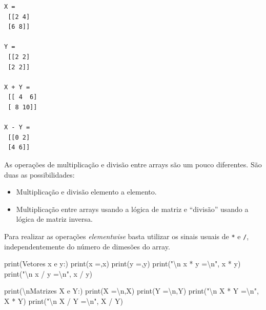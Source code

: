 \documentclass[
  brazilian,
  letterpaper,
  DIV=11,
  numbers=noendperiod]{scrreprt}
\newenvironment{Shaded}{\begin{snugshade}}{\end{snugshade}}
\newcommand{\BuiltInTok}[1]{\textcolor[rgb]{0.00,0.23,0.31}{#1}}
\newcommand{\CharTok}[1]{\textcolor[rgb]{0.13,0.47,0.30}{#1}}
\newcommand{\NormalTok}[1]{\textcolor[rgb]{0.00,0.23,0.31}{#1}}
\newcommand{\OperatorTok}[1]{\textcolor[rgb]{0.37,0.37,0.37}{#1}}
\newcommand{\StringTok}[1]{\textcolor[rgb]{0.13,0.47,0.30}{#1}}
\providecommand{\tightlist}{%
  \setlength{\itemsep}{0pt}\setlength{\parskip}{0pt}}
\begin{document}
\begin{verbatim}
X =
 [[2 4]
 [6 8]]

Y =
 [[2 2]
 [2 2]]

X + Y =
 [[ 4  6]
 [ 8 10]]

X - Y =
 [[0 2]
 [4 6]]
\end{verbatim}

As operações de multiplicação e divisão entre arrays são um pouco
diferentes. São duas as possibilidades:

\begin{itemize}
\tightlist
\item
  Multiplicação e divisão elemento a elemento.
\item
  Multiplicação entre arrays usando a lógica de matriz e ``divisão''
  usando a lógica de matriz inversa.
\end{itemize}

Para realizar as operações \emph{elementwise} basta utilizar os sinais
usuais de \texttt{*} e \texttt{/}, independentemente do número de
dimesões do array.

\begin{Shaded}
\begin{Highlighting}[]
\BuiltInTok{print}\NormalTok{(}\StringTok{\textquotesingle{}Vetores x e y:\textquotesingle{}}\NormalTok{)}
\BuiltInTok{print}\NormalTok{(}\StringTok{\textquotesingle{}x =\textquotesingle{}}\NormalTok{,x)}
\BuiltInTok{print}\NormalTok{(}\StringTok{\textquotesingle{}y =\textquotesingle{}}\NormalTok{,y)}
\BuiltInTok{print}\NormalTok{(}\StringTok{"}\CharTok{\textbackslash{}n}\StringTok{ x * y =}\CharTok{\textbackslash{}n}\StringTok{"}\NormalTok{, x }\OperatorTok{*}\NormalTok{ y)}
\BuiltInTok{print}\NormalTok{(}\StringTok{"}\CharTok{\textbackslash{}n}\StringTok{ x / y =}\CharTok{\textbackslash{}n}\StringTok{"}\NormalTok{, x }\OperatorTok{/}\NormalTok{ y)}

\BuiltInTok{print}\NormalTok{(}\StringTok{\textquotesingle{}}\CharTok{\textbackslash{}n}\StringTok{Matrizes X e Y:\textquotesingle{}}\NormalTok{)}
\BuiltInTok{print}\NormalTok{(}\StringTok{\textquotesingle{}X =}\CharTok{\textbackslash{}n}\StringTok{\textquotesingle{}}\NormalTok{,X)}
\BuiltInTok{print}\NormalTok{(}\StringTok{\textquotesingle{}Y =}\CharTok{\textbackslash{}n}\StringTok{\textquotesingle{}}\NormalTok{,Y)}
\BuiltInTok{print}\NormalTok{(}\StringTok{"}\CharTok{\textbackslash{}n}\StringTok{ X * Y =}\CharTok{\textbackslash{}n}\StringTok{"}\NormalTok{, X }\OperatorTok{*}\NormalTok{ Y)}
\BuiltInTok{print}\NormalTok{(}\StringTok{"}\CharTok{\textbackslash{}n}\StringTok{ X / Y =}\CharTok{\textbackslash{}n}\StringTok{"}\NormalTok{, X }\OperatorTok{/}\NormalTok{ Y)}
\end{Highlighting}
\end{Shaded}
\end{document}

